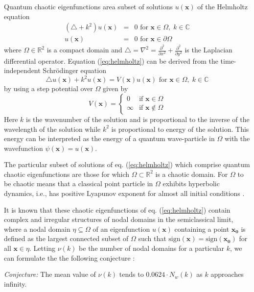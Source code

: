 \documentclass[english]{article}
\newcommand{\xx}[0]{\mathbf{x}}
\begin{document}
\begin{multicols}{2}
Quantum chaotic eigenfunctions area subset of solutions $u\left(\xx\right)$ of the Helmholtz equation 
\begin{eqnarray} \label{eq:helmholtz}
\left(\triangle+k^{2}\right)u\left(\xx\right) & = & 0\mbox{ for }\xx\in\Omega,\; k\in\mathbb{C} \\
u\left(\xx\right) & = & 0\mbox{ for }\xx\in\partial\Omega \nonumber
\end{eqnarray}
where $\Omega\in\mathbb{R}^2$ is a compact domain and $\triangle=\nabla^{2}=\frac{\partial^{2}}{\partial x^{2}}+\frac{\partial^{2}}{\partial y^{2}}$ is the Laplacian differential operator. Equation (\ref{eq:helmholtz}) can be derived from the time-independent Schr\"{o}dinger equation
\[
\triangle u \left(\xx\right)+k^{2}u\left(\xx\right)=V\left(\xx\right)u\left(\xx\right)\mbox{ for }\xx\in\Omega,\; k\in\mathbb{C}
\]
by using a step potential over $\Omega$ given by
\[
V\left(\xx\right)=\begin{cases}
0 & \mbox{if }\xx\in\Omega\\
\infty & \mbox{if }\xx\notin\Omega
\end{cases}
\]
Here $k$ is the wavenumber of the solution and is proportional to the inverse of the wavelength of the solution while $k^{2}$ is proportional to energy of the solution. This energy can be interpreted as the energy of a quantum wave-particle in $\Omega$ with the wavefunction $\psi\left(\xx\right)=u\left(\xx\right)$.

The particular subset of solutions of eq. (\ref{eq:helmholtz}) which comprise quantum chaotic eigenfunctions are those for which $\Omega\subset\mathbb{R}^{2}$ is a chaotic domain. For $\Omega$ to be chaotic means that a classical point particle in $\Omega$ exhibits hyperbolic dynamics, i.e., has positive Lyapunov exponent for almost all initial conditions \cite{chernov}.

It is known that these chaotic eigenfunctions of eq. (\ref{eq:helmholtz}) contain complex and irregular structures of nodal domains in the semiclassical limit, where a nodal domain $\eta\subseteq\Omega$ of an eigenfunction $u\left(\xx\right)$ containing a point $\mathbf{x_{0}}$ is defined as the largest connected subset of $\Omega$ such that $\text{sign}\left(\xx\right)=\text{sign}\left(\mathbf{x_{0}}\right)$ for all $\xx\in\eta$. Letting $\nu\left(k\right)$ be the number of nodal domains for a particular $k$, we can formulate the the following conjecture \cite{bogolmony}:

\vspace{10pt}
\noindent\emph{Conjecture:} The mean value of $\nu\left(k\right)$ tends to $0.0624\cdot N_{w}\left(k\right)$ as $k$ approaches infinity.
\label{conj:mean}
\vspace{10pt}


\end{multicols}
\end{document}
